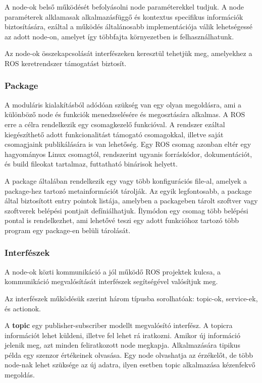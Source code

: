 A node-ok belső működését befolyásolni node paraméterekkel tudjuk. A node
paraméterek alklamasak alkalmazásfüggő és kontextus specifikus információk
biztosítására, ezáltal a működés általánosabb implementációja válik lehetségessé
az adott node-on, amelyet így többfajta környezetben is felhasználhatunk.

Az node-ok összekapcsolását interfészeken keresztül tehetjük meg, amelyekhez a
ROS keretrendszer támogatást biztosít.

\subsubsection{Package}

A moduláris kialakításból adódóan szükség van egy olyan megoldásra, ami a
különböző node és funkciók menedzselésére és megosztására alkalmas. A ROS erre a
célra rendelkezik egy csomagkezelő funkcióval. A rendszer ezáltal kiegészíthető
adott funkcionalitást támogató csomagokkal, illetve saját csomagjaink
publikálására is van lehetőség. Egy ROS csomag azonban eltér egy hagyományos
Linux csomagtól, rendszerint ugyanis forráskódor, dokumentációt, és build
fileokat tartalmaz, futtatható binárisok helyett. 

A package általában rendelkezik egy vagy több konfigurációs file-al, amelyek a
package-hez tartozó metainformációt tárolják. Az egyik legfontosabb, a package
által biztosított entry pointok listája, amelyben a packageben tárolt szoftver
vagy szoftverek belépési pontjait defíniálhatjuk. Ílymódon egy csomag több
belépési pontal is rendelkezhet, ami lehetővé teszi egy adott funkcióhoz tartozó
több program egy package-en belüli tárolását.

\subsubsection{Interfészek}

A node-ok közti kommunikáció a jól működő ROS projektek kulcsa, a  kommunikáció
megvalósítását interfészek segítségével valósítjuk meg.

Az interfészek működésük szerint három típusba sorolhatóak: topic-ok, service-ek,
és actionok.  

\medskip

A \textbf{topic} egy publisher-subscriber modellt megvalósító interfész. A
topicra információt lehet küldeni, illetve fel lehet rá iratkozni. Amikor új
információ jelenik meg, azt minden feliratkozott node megkapja. Alkalmazására
tipikus példa egy szenzor értékeinek olvasása. Egy node olvashatja az érzékelőt,
de több node-nak lehet szüksége az új adatra, ilyen esetben topic alkalmazása
kézenfekvő megoldás.

